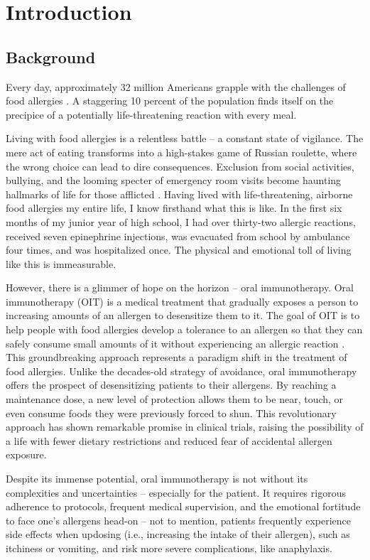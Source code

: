 \chapter{Introduction}

\section{Background}

Every day, approximately 32 million Americans grapple with the challenges of food allergies \cite{FARE}. A staggering 10 percent of the population finds itself on the precipice of a potentially life-threatening reaction with every meal. 

Living with food allergies is a relentless battle – a constant state of vigilance. The mere act of eating transforms into a high-stakes game of Russian roulette, where the wrong choice can lead to dire consequences. Exclusion from social activities, bullying, and the looming specter of emergency room visits become haunting hallmarks of life for those afflicted \cite{Brown}. Having lived with life-threatening, airborne food allergies my entire life, I know firsthand what this is like. In the first six months of my junior year of high school, I had over thirty-two allergic reactions, received seven epinephrine injections, was evacuated from school by ambulance four times, and was hospitalized once. The physical and emotional toll of living like this is immeasurable.

However, there is a glimmer of hope on the horizon – oral immunotherapy. Oral immunotherapy (OIT) is a medical treatment that gradually exposes a person to increasing amounts of an allergen to desensitize them to it. The goal of OIT is to help people with food allergies develop a tolerance to an allergen so that they can safely consume small amounts of it without experiencing an allergic reaction \cite{AAAAI}. This groundbreaking approach represents a paradigm shift in the treatment of food allergies. Unlike the decades-old strategy of avoidance, oral immunotherapy offers the prospect of desensitizing patients to their allergens. By reaching a maintenance dose, a new level of protection allows them to be near, touch, or even consume foods they were previously forced to shun. This revolutionary approach has shown remarkable promise in clinical trials, raising the possibility of a life with fewer dietary restrictions and reduced fear of accidental allergen exposure.

Despite its immense potential, oral immunotherapy is not without its complexities and uncertainties – especially for the patient. It requires rigorous adherence to protocols, frequent medical supervision, and the emotional fortitude to face one's allergens head-on – not to mention, patients frequently experience side effects when updosing (i.e., increasing the intake of their allergen), such as itchiness or vomiting, and risk more severe complications, like anaphylaxis.

